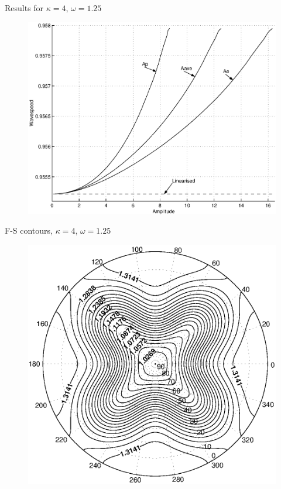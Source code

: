 \documentclass[pdf,distiller]{prosper}
\begin{document}
\begin{slide}{Results for $\kappa=4$, $\omega=1.25$}

\begin{figure}
	\centering
		\includegraphics[scale=0.49]{CvsAk4w125.eps}
	\end{figure}

\end{slide}

\begin{slide}{F-S contours, $\kappa=4$, $\omega=1.25$}
\begin{figure}
	\centering
		\includegraphics[scale=0.55]{k4w125fsend.eps}
	\end{figure}
\end{slide}
\end{document}
